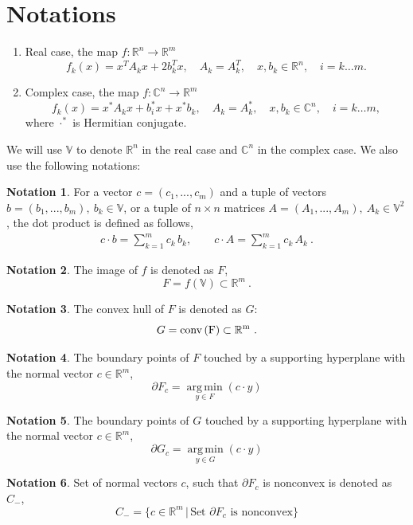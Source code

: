 \documentclass[a4paper]{article}
\DeclareMathOperator*{\argmin}{arg\,min}
\newcommand{\R}{\mathbb{R}}
\newcommand{\conv}{\rm{conv}\,}
\theoremstyle{definition}
\newtheorem{definition}{Notation}[]
\begin{document}
\newpage

\section*{Notations}
\begin{enumerate}
\item Real case, the map $f\colon \mathbb{R}^n\to\mathbb{R}^m$
\begin{equation}
f_k(x)=x^TA_k x+2b_k^Tx ,\quad A_k=A_k^T ,\quad x, b_k\in \mathbb{R}^n ,\quad i=k\dots m . \label{real}
\end{equation}
\item Complex case, the map $f\colon \mathbb{C}^n\to\mathbb{R}^m$
\begin{equation}
f_k(x)=x^*A_k x+b_i^*x+x^*b_k ,\quad A_k=A_k^* ,\quad x, b_k\in \mathbb{C}^n ,\quad i=k\dots m ,\label{complex}
\end{equation}
where $\cdot^*$ is Hermitian conjugate.
\end{enumerate}

We will use $\mathbb{V}$ to denote $\mathbb{R}^n$ in the real case and $\mathbb{C}^n$ in the  complex case.
We also use the following notations:\\

\theoremstyle{definition}
\begin{definition}
For a vector $c=(c_1,...,c_m)$ and a tuple of vectors $b=(b_1,...,b_m), \ b_k \in \mathbb{V}$, or a tuple of $n\times n$ matrices $A=(A_1,...,A_m), \  A_k\in \mathbb{V}^2$, the dot product is defined as follows,
\begin{eqnarray}
c\cdot b=\sum\limits_{k=1}^m c_k\, b_k ,\qquad
c\cdot A=\sum\limits_{k=1}^m c_k\, A_k\ . \nonumber
\end{eqnarray}
\end{definition}

\begin{definition}
The image of $f$ is denoted as $F$,
	$$F=f(\mathbb{V})\subset \mathbb{R}^m\ .$$
\end{definition}
\begin{definition} The convex hull of $F$ is denoted as $G$:
	$$G=\conv (F)\subset \mathbb{R}^m\ .$$
\end{definition}
\begin{definition} The boundary points of $F$ touched by a supporting hyperplane with the normal vector $c\in\mathbb{R}^m$,
	$$\partial F_c=\argmin\limits_{y\in F}(c\cdot y)$$
\end{definition}
\begin{definition} The boundary points of $G$ touched by a supporting hyperplane with the normal vector $c\in\mathbb{R}^m$,
	$$\partial G_c=\argmin\limits_{y\in G}(c\cdot y)$$
\end{definition}
\begin{definition}\label{ex:c_minus}
	Set of normal vectors $c$, such that $\partial F_c$ is nonconvex is denoted as $C_-$,
	$$
	C_-=\{c\in\R^m\,\big|\,\mbox{Set }\partial F_c\mbox{ is nonconvex}\}
	$$
\end{definition}
\end{document}
